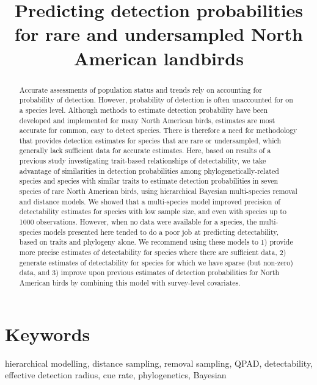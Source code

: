 \documentclass[12pt]{article}
\title{Predicting detection probabilities for rare and undersampled North American landbirds}
\date{}
\begin{document}
\maketitle

\begin{abstract}

		Accurate assessments of population status and trends rely on accounting for probability of detection.
		However, probability of detection is often unaccounted for on a species level. 
		Although methods to estimate detection probability have been developed and implemented for many North American birds, estimates are most accurate for common, easy to detect species. 
		There is therefore a need for methodology that provides detection estimates for species that are rare or undersampled, which generally lack sufficient data for accurate estimates. 
		Here, based on results of a previous study investigating trait-based relationships of detectability, we take advantage of similarities in detection probabilities among phylogenetically-related species and species with similar traits to estimate detection probabilities in seven species of rare North American birds, using hierarchical Bayesian multi-species removal and distance models. 
		We showed that a multi-species model improved precision of detectability estimates for species with low sample size, and even with species up to 1000 observations.
		However, when no data were available for a species, the multi-species models presented here tended to do a poor job at predicting detectability, based on traits and phylogeny alone. 
		We recommend using these models to 1) provide more precise estimates of detectability for species where there are sufficient data, 2) generate estimates of detectability for species for which we have sparse (but non-zero) data, and 3) improve upon previous estimates of detection probabilities for North American birds by combining this model with survey-level covariates.




\end{abstract}

\section{Keywords}
\par hierarchical modelling, distance sampling, removal sampling, QPAD, detectability, effective detection radius, cue rate, phylogenetics, Bayesian
\end{document}
